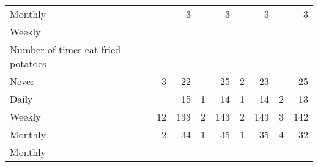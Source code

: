 \documentclass{article}
\begin{document}
\begin{tabular}{lllllllll}
\multicolumn{1}{l}{\hspace{5em}Monthly} &
  \multicolumn{1}{|r}{} &
  \multicolumn{1}{r}{3} &
  \multicolumn{1}{r}{} &
  \multicolumn{1}{r}{3} &
  \multicolumn{1}{r}{} &
  \multicolumn{1}{r}{3} &
  \multicolumn{1}{r}{} &
  \multicolumn{1}{r}{3} \\
\multicolumn{1}{l}{\hspace{3em}Weekly} &
  \multicolumn{1}{|r}{} &
  \multicolumn{1}{r}{} &
  \multicolumn{1}{r}{} &
  \multicolumn{1}{r}{} &
  \multicolumn{1}{r}{} &
  \multicolumn{1}{r}{} &
  \multicolumn{1}{r}{} &
  \multicolumn{1}{r}{} \\
\multicolumn{1}{l}{\hspace{4em}Number of times eat fried potatoes} &
  \multicolumn{1}{|r}{} &
  \multicolumn{1}{r}{} &
  \multicolumn{1}{r}{} &
  \multicolumn{1}{r}{} &
  \multicolumn{1}{r}{} &
  \multicolumn{1}{r}{} &
  \multicolumn{1}{r}{} &
  \multicolumn{1}{r}{} \\
\multicolumn{1}{l}{\hspace{5em}Never} &
  \multicolumn{1}{|r}{3} &
  \multicolumn{1}{r}{22} &
  \multicolumn{1}{r}{} &
  \multicolumn{1}{r}{25} &
  \multicolumn{1}{r}{2} &
  \multicolumn{1}{r}{23} &
  \multicolumn{1}{r}{} &
  \multicolumn{1}{r}{25} \\
\multicolumn{1}{l}{\hspace{5em}Daily} &
  \multicolumn{1}{|r}{} &
  \multicolumn{1}{r}{15} &
  \multicolumn{1}{r}{1} &
  \multicolumn{1}{r}{14} &
  \multicolumn{1}{r}{1} &
  \multicolumn{1}{r}{14} &
  \multicolumn{1}{r}{2} &
  \multicolumn{1}{r}{13} \\
\multicolumn{1}{l}{\hspace{5em}Weekly} &
  \multicolumn{1}{|r}{12} &
  \multicolumn{1}{r}{133} &
  \multicolumn{1}{r}{2} &
  \multicolumn{1}{r}{143} &
  \multicolumn{1}{r}{2} &
  \multicolumn{1}{r}{143} &
  \multicolumn{1}{r}{3} &
  \multicolumn{1}{r}{142} \\
\multicolumn{1}{l}{\hspace{5em}Monthly} &
  \multicolumn{1}{|r}{2} &
  \multicolumn{1}{r}{34} &
  \multicolumn{1}{r}{1} &
  \multicolumn{1}{r}{35} &
  \multicolumn{1}{r}{1} &
  \multicolumn{1}{r}{35} &
  \multicolumn{1}{r}{4} &
  \multicolumn{1}{r}{32} \\
\multicolumn{1}{l}{\hspace{3em}Monthly} &
  \multicolumn{1}{|r}{} &
  \multicolumn{1}{r}{} &
  \multicolumn{1}{r}{} &
  \multicolumn{1}{r}{} &
  \multicolumn{1}{r}{} &
  \multicolumn{1}{r}{} &
  \multicolumn{1}{r}{} &

\end{tabular}
\end{document}
